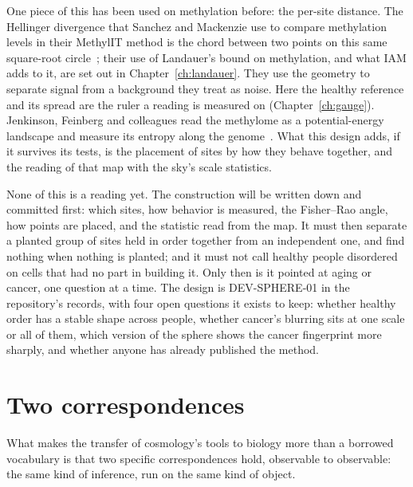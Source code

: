 One piece of this has been used on methylation before: the per-site distance. The Hellinger divergence that Sanchez and Mackenzie use to compare methylation
levels in their MethylIT method is the chord between two points on this same square-root circle~\cite{Sanchez2016,Sanchez2019}; their
use of Landauer's bound on methylation, and what IAM adds to it, are set out in Chapter~\ref{ch:landauer}. They use the geometry to
separate signal from a background they treat as noise. Here the healthy reference and its spread are the ruler a reading is measured on
(Chapter~\ref{ch:gauge}). Jenkinson, Feinberg and colleagues read the
methylome as a potential-energy landscape and measure its entropy along the genome~\cite{Jenkinson2017}. What this design adds, if it
survives its tests, is the placement of sites by how they behave together, and the reading of that map with the sky's scale statistics.

None of this is a reading yet. The construction will be written down and committed first: which sites, how behavior is measured, the
Fisher--Rao angle, how points are placed, and the statistic read from the map. It must then separate a planted group of sites held in
order together from an independent one, and find nothing when nothing is planted; and it must not call healthy people disordered on
cells that had no part in building it. Only then is it pointed at aging or cancer, one question at a time. The design is
DEV-SPHERE-01 in the repository's records, with four open questions it exists to keep: whether healthy order has a stable shape
across people, whether cancer's blurring sits at one scale or all of them, which version of the sphere shows the cancer fingerprint
more sharply, and whether anyone has already published the method.

\section{Two correspondences}\label{sec:ag_two}

What makes the transfer of cosmology's tools to biology more than a borrowed vocabulary is that two specific correspondences hold,
observable to observable: the same kind of inference, run on the same kind of object.

